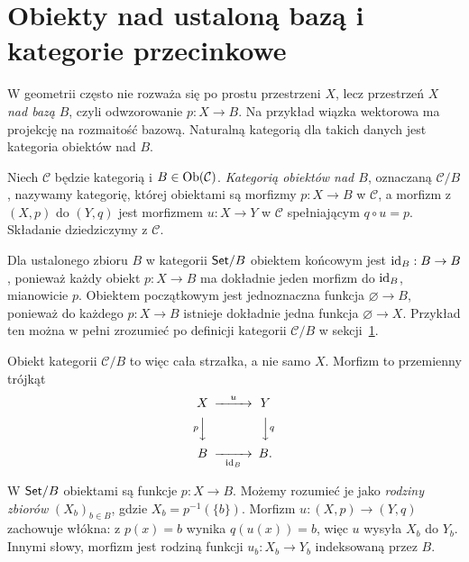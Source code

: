 \section{Obiekty nad ustaloną bazą i kategorie przecinkowe}\label{sec:slice}

W geometrii często nie rozważa się po prostu przestrzeni $X$, lecz przestrzeń $X$ \emph{nad bazą} $B$, czyli odwzorowanie $p:X\to B$. Na przykład wiązka wektorowa ma projekcję na rozmaitość bazową. Naturalną kategorią dla takich danych jest kategoria obiektów nad $B$.

\begin{definicja}\label{def:slice}
Niech $\mathcal C$ będzie kategorią i $B\in\operatorname{Ob}(\mathcal C)$. \emph{Kategorią obiektów nad $B$}, oznaczaną $\mathcal C/B$, nazywamy kategorię, której obiektami są morfizmy $p:X\to B$ w $\mathcal C$, a morfizm z $(X,p)$ do $(Y,q)$ jest morfizmem $u:X\to Y$ w $\mathcal C$ spełniającym $q\circ u=p$. Składanie dziedziczymy z $\mathcal C$.
\end{definicja}

\begin{przyklad}
Dla ustalonego zbioru $B$ w kategorii $\mathsf{Set}/B$ obiektem końcowym jest $\mathrm{id}_B:B\to B$, ponieważ każdy obiekt $p:X\to B$ ma dokładnie jeden morfizm do $\mathrm{id}_B$, mianowicie $p$. Obiektem początkowym jest jednoznaczna funkcja $\varnothing\to B$, ponieważ do każdego $p:X\to B$ istnieje dokładnie jedna funkcja $\varnothing\to X$. Przykład ten można w pełni zrozumieć po definicji kategorii $\mathcal C/B$ w sekcji~\ref{sec:slice}.
\end{przyklad}

Obiekt kategorii $\mathcal C/B$ to więc cała strzałka, a nie samo $X$. Morfizm to przemienny trójkąt
\[
\begin{CD}
X @>{u}>> Y\\
@V{p}VV @VV{q}V\\
B @>>{\id_B}> B.
\end{CD}
\]

\begin{przyklad}
W $\mathsf{Set}/B$ obiektami są funkcje $p:X\to B$. Możemy rozumieć je jako \emph{rodziny zbiorów} $(X_b)_{b\in B}$, gdzie $X_b=p^{-1}(\{b\})$. Morfizm $u:(X,p)\to(Y,q)$ zachowuje włókna: z $p(x)=b$ wynika $q(u(x))=b$, więc $u$ wysyła $X_b$ do $Y_b$. Innymi słowy, morfizm jest rodziną funkcji $u_b:X_b\to Y_b$ indeksowaną przez $B$.
\end{przyklad}


